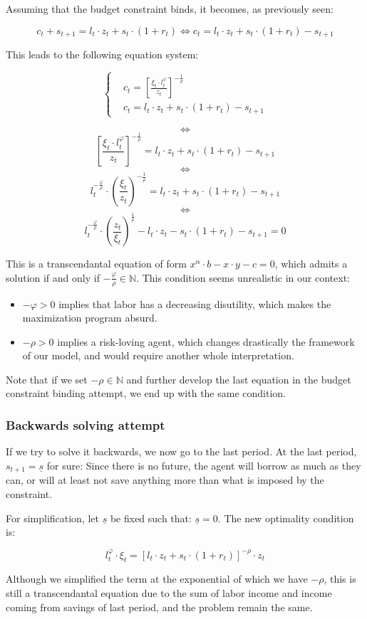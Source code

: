 \documentclass{article}
\begin{document}
Assuming that the budget constraint binds, it becomes, as previously seen:

$$c_{t} + s_{t+1} = l_{t}\cdot z_{t} + s_{t}\cdot(1+r_{t})
\iff 
c_{t} = l_{t}\cdot z_{t} + s_{t}\cdot(1+r_{t}) - s_{t+1} 
$$

This leads to the following equation system: 

$$
\begin{cases}
    & c_t = \left[\frac{\xi_{t}\cdot l_{t}^{\varphi}}{z_{t}}\right]^{-\frac{1}{\rho}} \\
    & c_{t} = l_{t}\cdot z_{t} + s_{t}\cdot(1+r_{t}) - s_{t+1} 
\end{cases}
$$

$$\iff$$
$$ \left[\frac{\xi_{t}\cdot l_{t}^{\varphi}}{z_{t}}\right]^{-\frac{1}{\rho}} = l_{t}\cdot z_{t} + s_{t}\cdot(1+r_{t}) - s_{t+1} $$
$$\iff$$
$$ l_{t}^{-\frac{\varphi}{\rho}} \cdot \left(\frac{\xi_{t}}{z_{t}}\right)^{-\frac{1}{\rho}} = l_{t}\cdot z_{t} + s_{t}\cdot(1+r_{t}) - s_{t+1} $$
$$\iff$$
$$ l_{t}^{-\frac{\varphi}{\rho}} \cdot \left(\frac{z_{t}}{\xi_{t}}\right)^{\frac{1}{\rho}} - l_{t}\cdot z_{t} - s_{t}\cdot(1+r_{t}) - s_{t+1} = 0 $$

This is a transcendantal equation of form 
$x^{\alpha}\cdot b - x\cdot y - c = 0$,
which admits a solution if and only if $-\frac{\varphi}{\rho} \in \mathbb{N}$.
This condition seems unrealistic in our context: 

\begin{itemize}
    \item $-\varphi >0$ implies that labor has a decreasing disutility,
    which makes the maximization program absurd.
    \item $-\rho >0$ implies a risk-loving agent, which changes 
    drastically the framework of our model, and would require another whole 
    interpretation.
\end{itemize}

Note that if we set $-\rho\in\mathbb{N}$ and further develop the last equation in the 
budget constraint binding attempt, we end up with the same condition.

\subsubsection{Backwards solving attempt}

If we try to solve it backwards, we now go to the last period. 
At the last period, $s_{t+1} = \underline{s}$ for sure:
Since there is no future, 
the agent will borrow as much as they can,
or will at least not save anything more than what is imposed 
by the constraint. 

For simplification, let $\underline{s}$ be fixed such that: $\underline{s} = 0$.
The new optimality condition is: 

\begin{equation}
    l_{t}^{\varphi}\cdot \xi_{t} = \left[l_{t}\cdot z_{t} + s_{t}\cdot(1+r_{t})\right]^{-\rho}\cdot z_{t}
\end{equation}

Although we simplified the term at the exponential of which 
we have $-\rho$, this is still a transcendantal equation due to the sum 
of labor income and income coming from savings of last period, 
and the problem remain the same.
\end{document}
